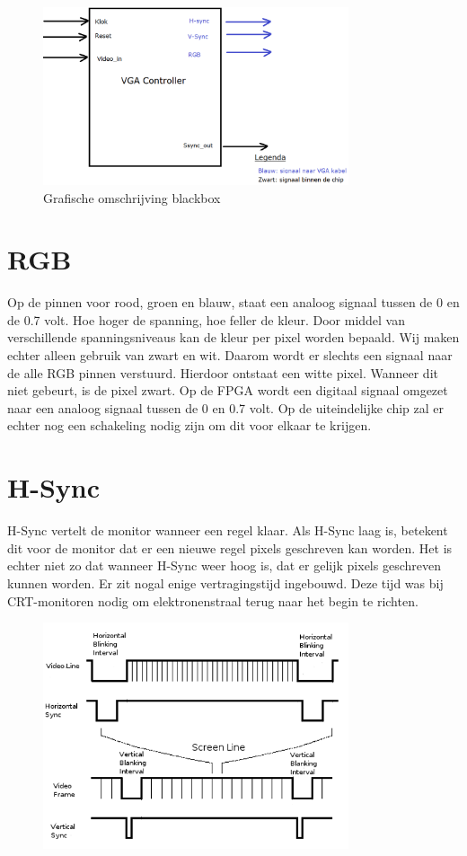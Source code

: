 \documentclass[oneside,dutch]{tudelft-report}
\begin{document}
\begin{figure}[H]
\center
\includegraphics[width=9cm]{totaal-overzicht}
\caption{Grafische omschrijving blackbox}
\label{VGA}
\end{figure}

\section{RGB}
Op de pinnen voor rood, groen en blauw, staat een analoog signaal tussen de 0 en de 0.7 volt. Hoe hoger de spanning, hoe feller de kleur. Door middel van verschillende spanningsniveaus kan de kleur per pixel worden bepaald. Wij maken echter alleen gebruik van zwart en wit. Daarom wordt er slechts een signaal naar de alle RGB pinnen verstuurd. Hierdoor ontstaat een witte pixel. Wanneer dit niet gebeurt, is de pixel zwart. Op de FPGA wordt een digitaal signaal omgezet naar een analoog signaal tussen de 0 en 0.7 volt. Op de uiteindelijke chip zal er echter nog een schakeling nodig zijn om dit voor elkaar te krijgen. 

\section{H-Sync}
H-Sync vertelt de monitor wanneer een regel klaar. Als H-Sync laag is, betekent dit voor de monitor dat er een nieuwe regel pixels geschreven kan worden. Het is echter niet zo dat wanneer H-Sync weer hoog is, dat er gelijk pixels geschreven kunnen worden. Er zit nogal enige vertragingstijd ingebouwd. Deze tijd was bij CRT-monitoren nodig om elektronenstraal terug naar het begin te richten.

\begin{figure}[H]
\center
\includegraphics[width=9cm]{VGA_signal_format}
\caption{}
\label{VGA}
\end{figure}
\end{document}
